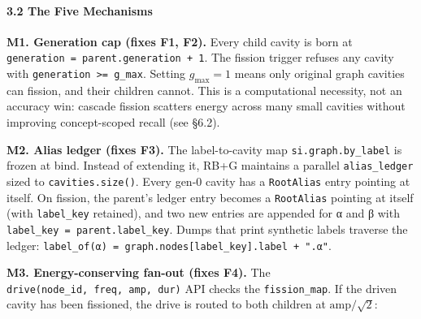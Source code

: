 \documentclass[
  11pt,
  a4paper,
]{article}
\begin{document}
\paragraph{3.2 The Five Mechanisms}\label{the-five-mechanisms}

\textbf{M1. Generation cap (fixes F1, F2).} Every child cavity is born
at \texttt{generation\ =\ parent.generation\ +\ 1}. The fission trigger
refuses any cavity with \texttt{generation\ \textgreater{}=\ g\_max}.
Setting \(g_\text{max} = 1\) means only original graph cavities can
fission, and their children cannot. This is a computational necessity,
not an accuracy win: cascade fission scatters energy across many small
cavities without improving concept-scoped recall (see §6.2).

\textbf{M2. Alias ledger (fixes F3).} The label-to-cavity map
\texttt{si.graph.by\_label} is frozen at bind. Instead of extending it,
RB+G maintains a parallel \texttt{alias\_ledger} sized to
\texttt{cavities.size()}. Every gen-0 cavity has a \texttt{RootAlias}
entry pointing at itself. On fission, the parent's ledger entry becomes
a \texttt{RootAlias} pointing at itself (with \texttt{label\_key}
retained), and two new entries are appended for α and β with
\texttt{label\_key\ =\ parent.label\_key}. Dumps that print synthetic
labels traverse the ledger:
\texttt{label\_of(α)\ =\ graph.nodes{[}label\_key{]}.label\ +\ ".α"}.

\textbf{M3. Energy-conserving fan-out (fixes F4).} The
\texttt{drive(node\_id,\ freq,\ amp,\ dur)} API checks the
\texttt{fission\_map}. If the driven cavity has been fissioned, the
drive is routed to both children at \(\text{amp} / \sqrt{2}\):
\end{document}

